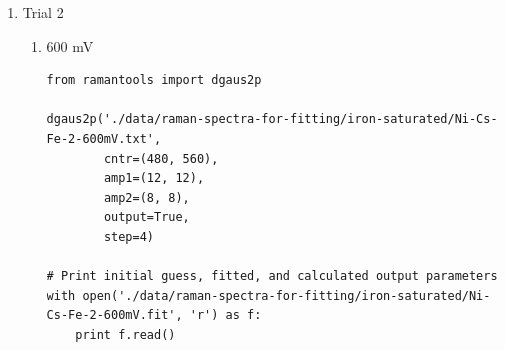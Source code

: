 \documentclass[journal=jpccck,manuscript=suppinfo,email=true]{achemso}
\begin{document}
\begin{enumerate}
\begin{enumerate}
\begin{enumerate}
\item 800 mV
\label{sec-4-2-0-2-1-3}
\begin{verbatim}
from ramantools import dgaus2p

dgaus2p('./data/raman-spectra-for-fitting/iron-saturated/Ni-Cs-Fe-1-800mV.txt',
        cntr=(480, 560),
        amp1=(10, 10),
        amp2=(6, 6),
        output=True,
        step=4)

# Print initial guess, fitted, and calculated output parameters
with open('./data/raman-spectra-for-fitting/iron-saturated/Ni-Cs-Fe-1-800mV.fit', 'r') as f:
    print f.read()
\end{verbatim}

\begin{verbatim}
Initial guess parameters:
=========================
                      Peak 1, Peak 2
Peak center =         480.0, 560.00
Amplitude fit 1 =     10.0, 10.00
Amplitude fit 2 =     6.0, 6.00
Standard dev. fit 1 = 10.0, 5.0
Standard dev. fit 2 = 10.0, 5.0

Baseline parameters:
=========================
Slope =               -0.01
Intercept =           13.48

Fitted parameters:
=========================
                      Peak 1, Peak 2
Peak center =         478.43, 556.47
Amplitude fit 1 =     4.63, 11.54
Amplitude fit 2 =     3.48, 4.34
Standard dev. fit 1 = 20.36, 6.71
Standard dev. fit 2 = 30.97, 6.62

Calculation output:
========================
Mean peak 1 =         478.4 $\pm$ 0.31
Mean peak 2 =         556.5 $\pm$ 0.84
Height peak 1 =       25.9 $\pm$ 0.40
Height peak 2 =       16.9 $\pm$ 0.37
Area peak 1 =         608.3
Area peak 2 =         484.0
\end{verbatim}
\end{enumerate}

\item Trial 2
\label{sec-4-2-0-2-2}
\begin{enumerate}
\item 600 mV
\label{sec-4-2-0-2-2-1}
\begin{verbatim}
from ramantools import dgaus2p

dgaus2p('./data/raman-spectra-for-fitting/iron-saturated/Ni-Cs-Fe-2-600mV.txt',
        cntr=(480, 560),
        amp1=(12, 12),
        amp2=(8, 8),
        output=True,
        step=4)

# Print initial guess, fitted, and calculated output parameters
with open('./data/raman-spectra-for-fitting/iron-saturated/Ni-Cs-Fe-2-600mV.fit', 'r') as f:
    print f.read()
\end{verbatim}


\end{enumerate}
\end{enumerate}
\end{enumerate}
\end{document}
